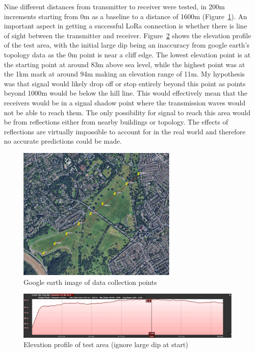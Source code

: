 Nine different distances from transmitter to receiver were tested, in 200m
increments starting from 0m as a baseline to a distance of 1600m
(Figure~\ref{fig:range-test-markers}). An important aspect in getting a
successful LoRa connection is whether there is line of sight between the
transmitter and receiver. Figure~\ref{fig:range-test-elevation} shows the
elevation profile of the test area, with the initial large dip being an
inaccuracy from google earth's topology data as the 0m point is near a cliff
edge. The lowest elevation point is at the starting point at around 83m above
sea level, while the highest point was at the 1km mark at around 94m making an
elevation range of 11m. My hypothesis was that signal would likely drop off or
stop entirely beyond this point as points beyond 1000m would be below the hill
line. This would effectively mean that the receivers would be in a signal shadow
point where the transmission waves would not be able to reach them. The only
possibility for signal to reach this area would be from reflections either from
nearby buildings or topology. The effects of reflections are virtually
impossible to account for in the real world and therefore no accurate
predictions could be made.

\begin{figure}[H]
    \centering
    \includegraphics[width=0.7\textwidth]{contents/part-2/fig2/range-test-markers.jpg}
    \caption{Google earth image of data collection points}
    \label{fig:range-test-markers}
\end{figure}


\begin{figure}[H]
    \centering
    \includegraphics[width=1\textwidth]{contents/part-2/fig2/range-test-elevation-profile.jpg}
    \caption{Elevation profile of test area (ignore large dip at start)}
    \label{fig:range-test-elevation}
\end{figure}

